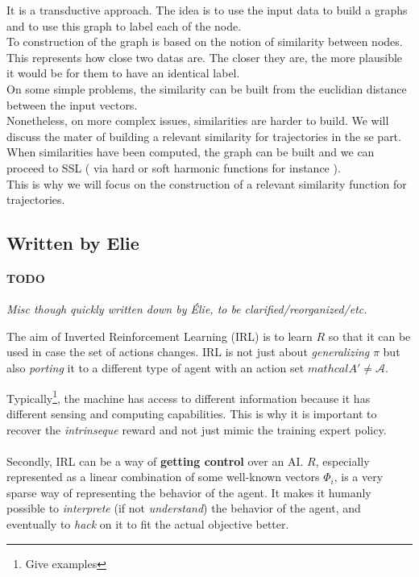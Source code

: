 \documentclass{article}
\begin{document}
It is a transductive approach. 
The idea is to use the input data to build a graphs and to use this graph to label each of the node. \\
To construction of the graph is based on the notion of similarity between nodes.\\ This represents how close two datas are. The closer they are, the more plausible it would be for them to have an identical label.\\
On some simple problems, the similarity can be built from the euclidian distance between the input vectors.\\
Nonetheless, on more complex issues, similarities are harder to build. We will discuss the mater of building a relevant similarity for trajectories in the se part.
When similarities have been computed, the graph can be built and we can proceed to SSL ( via hard or soft harmonic functions for instance ).\\
This is why we will focus on the construction of a relevant similarity function for trajectories.


\subsection{Written by Elie}

\paragraph{TODO}
\emph{Misc though quickly written down by Élie, to be clarified/reorganized/etc.}

The aim of Inverted Reinforcement Learning (IRL) is to learn $R$ so that it can be used in case the set of actions changes. IRL is not just about \emph{generalizing} $\pi$ but also \emph{porting} it to a different type of agent with an action set $mathcal A' \neq \mathcal A$. %

Typically\footnote{Give examples}, the machine has access to different information because it has different sensing and computing capabilities. This is why it is important to recover the \emph{intrinseque} reward and not just mimic the training expert policy.

\paragraph{}
Secondly, IRL can be a way of \textbf{getting control} over an AI. $R$, especially represented as a linear combination of some well-known vectors $\Phi_i$, is a very sparse way of representing the behavior of the agent. It makes it humanly possible to \emph{interprete} (if not \emph{understand}) the behavior of the agent, and eventually to \emph{hack} on it to fit the actual objective better.
\end{document}
